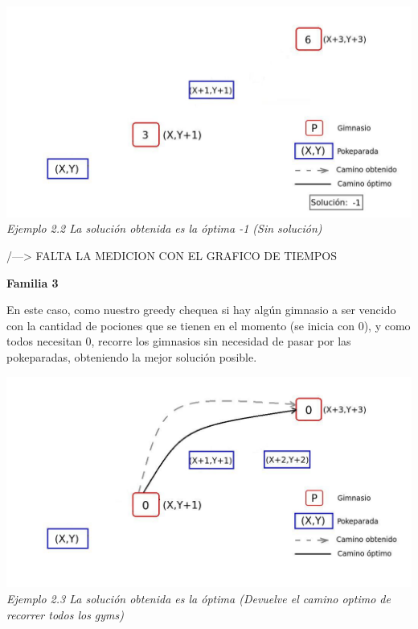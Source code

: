   \vspace*{0.3cm} \vspace*{0.3cm}
  \begin{center}
\includegraphics[scale=0.60]{./EJ2/sinSolucion1.jpeg}
\\{\textit{Ejemplo 2.2 La soluci\'on obtenida es la \'optima -1 (Sin soluci\'on)}}
  \end{center}
  \vspace*{0.3cm}


/---> FALTA LA MEDICION CON EL GRAFICO DE TIEMPOS

\begin{center}
\textbf{Familia 3}
\end{center}

En este caso, como nuestro greedy chequea si hay alg\'un gimnasio a ser vencido con la cantidad de pociones que se tienen en el momento (se inicia con 0), y como todos necesitan 0, recorre los gimnasios sin necesidad de pasar por las pokeparadas, obteniendo la mejor soluci\'on posible.

  \vspace*{0.3cm} \vspace*{0.3cm}
  \begin{center}
\includegraphics[scale=0.60]{./EJ2/gym0.jpeg}
\\{\textit{Ejemplo 2.3 La soluci\'on obtenida es la \'optima (Devuelve el camino optimo de recorrer todos los gyms)}}
  \end{center}
  \vspace*{0.3cm}


